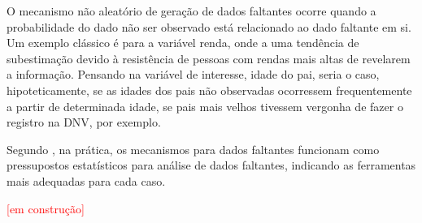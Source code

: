 O mecanismo não aleatório de geração de dados faltantes ocorre quando a probabilidade do dado não ser observado está relacionado ao dado faltante em si. Um exemplo clássico é para a variável renda, onde a uma tendência de subestimação devido à resistência de pessoas com rendas mais altas de revelarem a informação. Pensando na variável de interesse, idade do pai, seria o caso, hipoteticamente, se as idades dos pais não observadas ocorressem frequentemente a partir de determinada idade, se pais mais velhos tivessem vergonha de fazer o registro na DNV, por exemplo. 





Segundo , na prática, os mecanismos para dados faltantes funcionam como pressupostos estatísticos para análise de dados faltantes, indicando as ferramentas mais adequadas para cada caso.




\textcolor{red}{[em construção]}



